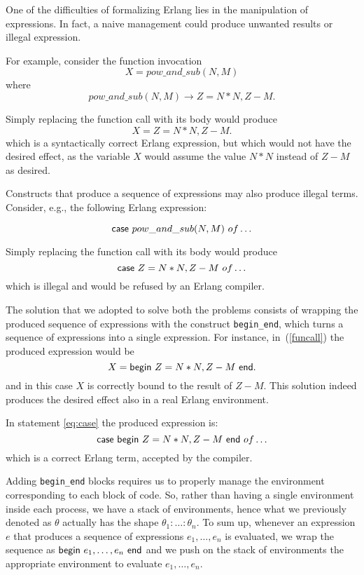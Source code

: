 \documentclass{article}[12pt,a4paper]
\theoremstyle{definition}
\begin{document}
One of the difficulties of formalizing Erlang lies in the manipulation of
expressions. In fact, a naive management could produce unwanted results or illegal
expression.

For example, consider the function invocation
\begin{equation}\label{funcall}
  X=pow\_and\_sub(N,M) 
\end{equation}
where
\[
  pow\_and\_sub(N,M) \rightarrow Z = N*N, Z-M.
\]

Simply replacing the function call with its body would produce
\[
  X = Z = N*N, Z-M.
\]
which is a syntactically correct Erlang expression, but which would not have the desired effect, as the variable $X$ would assume the
value $N*N$ instead of $Z-M$ as desired.

Constructs that produce a sequence of expressions
may also produce illegal terms. Consider, e.g., the
following Erlang expression:

\begin{equation}\label{eq:case}
  \mathsf{case}~pow\_and\_sub(N,M)~of \ldots
\end{equation}

Simply replacing the function call with its body would produce 
\[
  \mathsf{case}~Z = N*N, Z-M~of \ldots
\]
which is illegal and would be refused by an Erlang compiler.

The solution that we adopted to solve both the problems consists of wrapping the produced sequence of
expressions with the construct \verb+begin_end+, which turns a sequence of expressions into a single expression. For instance, in~(\ref{funcall}) the produced expression
would be 
\[
  X = \mathsf{begin}~Z = N*N, Z-M~\mathsf{end}.
\]
and in this case $X$ is correctly bound to the result of $Z-M$. This solution indeed
produces the desired effect also in a real Erlang environment.

In statement \ref{eq:case} the produced expression is:
\[
  \mathsf{case}~\mathsf{begin}~Z = N*N, Z-M~\mathsf{end}~of \ldots
\]
which is a correct Erlang term, accepted by the compiler. 

Adding \verb+begin_end+ blocks
requires us to properly manage the environment
corresponding to each block of code. So, rather than having a single
environment inside each process, we have a stack of environments, hence what we previously denoted as $\theta$ actually has the
shape $\theta_1:\ldots:\theta_n$. To sum up, whenever an expression $e$ that produces a sequence of expressions $e_1,\ldots,e_n$ is evaluated, we wrap
the sequence as $\mathsf{begin}~e_1,\ldots,e_n~\mathsf{end}$ and we push on the stack
of environments the appropriate environment to evaluate $e_1,\ldots,e_n$. 
\end{document}
